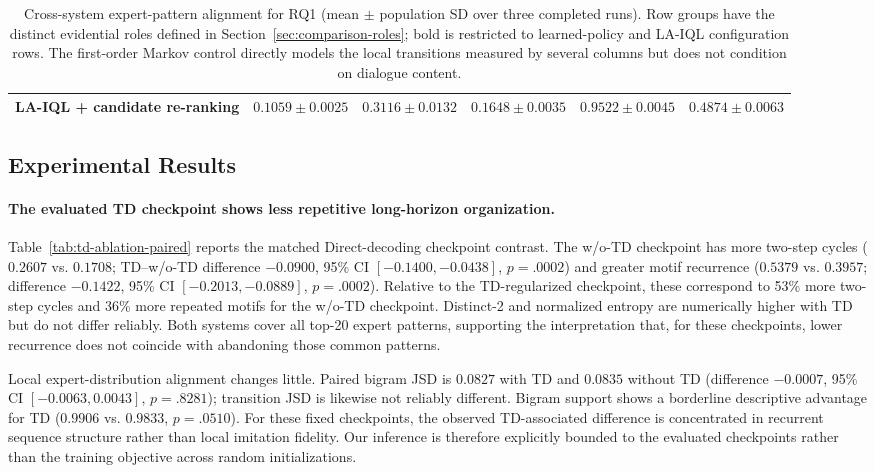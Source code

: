 \documentclass[manuscript,review,anonymous]{acmart}
\begin{document}
\begin{table}[t]
{\begin{tabular}{lrrrrr}
LA-IQL + candidate re-ranking & $0.1059 \pm 0.0025$ & $0.3116 \pm 0.0132$ & $0.1648 \pm 0.0035$ & $0.9522 \pm 0.0045$ & $0.4874 \pm 0.0063$ \\
\bottomrule
\end{tabular}
}
\caption{Cross-system expert-pattern alignment for RQ1 (mean $\pm$ population SD over three
completed runs).
Row groups have the distinct evidential roles defined in
Section~\ref{sec:comparison-roles}; bold is restricted to learned-policy and LA-IQL
configuration rows. The first-order Markov control
directly models the local transitions measured by several columns but does not
condition on dialogue content.}
\label{tab:g2-baseline-results}
\end{table}

\subsection{Experimental Results}

\paragraph{The evaluated TD checkpoint shows less repetitive long-horizon organization.}
Table~\ref{tab:td-ablation-paired} reports the matched Direct-decoding
checkpoint contrast. The w/o-TD checkpoint has more two-step cycles
($0.2607$ vs. $0.1708$; TD--w/o-TD difference $-0.0900$, 95\% CI
$[-0.1400,-0.0438]$,
$p=.0002$) and greater motif recurrence ($0.5379$ vs. $0.3957$; difference
$-0.1422$, 95\% CI $[-0.2013,-0.0889]$, $p=.0002$). Relative to the
TD-regularized checkpoint, these correspond to 53\% more two-step cycles and
36\% more repeated motifs for the w/o-TD checkpoint. Distinct-2 and normalized
entropy are numerically higher with TD but do not differ reliably. Both
systems cover all top-20 expert patterns, supporting the interpretation that,
for these checkpoints, lower recurrence does not coincide with abandoning
those common patterns.

Local expert-distribution alignment changes little. Paired bigram JSD is
$0.0827$ with TD and $0.0835$ without TD (difference $-0.0007$, 95\% CI
$[-0.0063,0.0043]$, $p=.8281$); transition JSD is likewise
not reliably different. Bigram support shows a borderline descriptive advantage for
TD ($0.9906$ vs. $0.9833$, $p=.0510$). For these fixed checkpoints, the
observed TD-associated difference is concentrated in recurrent sequence
structure rather than local imitation fidelity. Our inference is therefore
explicitly bounded to the evaluated checkpoints rather than the training
objective across random initializations.
\end{document}
